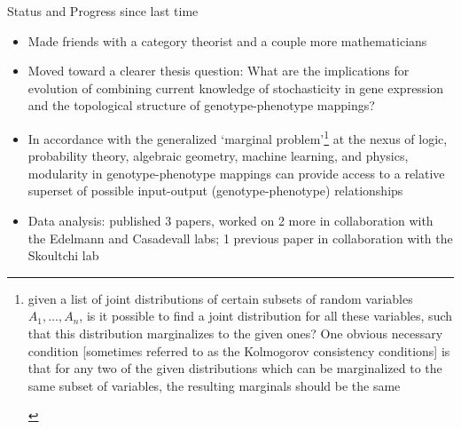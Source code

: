 

%

\newtoggle{thmsty}
\togglefalse{thmsty}

\newtoggle{longpres}
\togglefalse{longpres}









	\begin{frame}
		\titlepage
	\end{frame}
	
	\begin{frame}
	\begin{block}{Status and Progress since last time}
	\begin{footnotesize}	
	\begin{itemize}
	\item Made friends with a category theorist and a couple more mathematicians
	\item Moved toward a clearer thesis question: What are the implications for evolution of combining current knowledge of stochasticity in gene expression and the topological structure of genotype-phenotype mappings? 
	\item In accordance with the generalized `marginal problem'\footnote{\begin{tiny}
given a list of joint distributions of certain subsets of random variables $A_1, \ldots , A_n$, is it possible to find a joint distribution for all these variables, such that this distribution marginalizes to the given ones? One obvious necessary condition [sometimes referred to as the Kolmogorov consistency conditions] is that for any two of the given distributions which can be marginalized to the same subset of variables, the resulting marginals should be the same \cite{Fritz}
	\end{tiny}} at the nexus of logic, probability theory, algebraic geometry, machine learning, and physics, modularity in genotype-phenotype mappings can provide access to a relative superset of possible input-output (genotype-phenotype) relationships
	\item Data analysis: published 3 papers, worked on 2 more in collaboration with the Edelmann and Casadevall labs; 1 previous paper in collaboration with the Skoultchi lab
	\end{itemize}		
	\end{footnotesize}
	\end{block}
	\end{frame}

